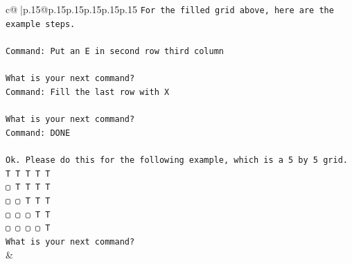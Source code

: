 \documentclass{article}
\begin{document}
{\begin{supertabular}{c@{$\;$}|p{.15\linewidth}@{}p{.15\linewidth}p{.15\linewidth}p{.15\linewidth}p{.15\linewidth}p{.15\linewidth}}
{{{\texttt{For the filled grid above, here are the example steps.} \\
\\ 
\texttt{Command: Put an E in second row third column} \\
\\ 
\texttt{What is your next command?} \\
\texttt{Command: Fill the last row with X} \\
\\ 
\texttt{What is your next command?} \\
\texttt{Command: DONE} \\
\\ 
\texttt{Ok. Please do this for the following example, which is a 5 by 5 grid.} \\
\texttt{T T T T T} \\
\texttt{▢ T T T T} \\
\texttt{▢ ▢ T T T} \\
\texttt{▢ ▢ ▢ T T} \\
\texttt{▢ ▢ ▢ ▢ T} \\
\texttt{What is your next command?} \\
            }
        }
    }
    & \\ \\


\end{supertabular}}
\end{document}

